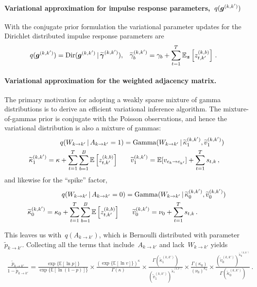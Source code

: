 \paragraph{Variational approximation for impulse response parameters,~$q(\boldsymbol{g}^{(k,k')})$}
With the conjugate prior formulation the variational parameter updates for the Dirichlet distributed impulse response parameters are
\begin{align*}
q(\boldsymbol{g}^{(k,k')}) &= \mathrm{Dir}(\boldsymbol{g}^{(k,k')} \,|\, \widetilde{\boldsymbol{\gamma}}^{(k,k')}), &
\widetilde{\gamma}_b^{(k,k')} &= \gamma_{b} + \sum_{t=1}^T \mathbb{E}_{\boldsymbol{z}}\left[z_{t,k'}^{(k,b)}\right]\,.
\end{align*}

\paragraph{Variational approximation for the weighted adjacency matrix.}
The primary motivation for adopting a weakly sparse mixture of gamma distributions is to derive an efficient variational inference algorithm.
The mixture-of-gammas prior is conjugate with the Poisson observations, and hence the variational distribution is also a mixture of gammas:
\begin{align*}
q(W_{k \to k'} \,|\, A_{k \to k'}=1) &= \mathrm{Gamma}(W_{k \to k'} \,|\, \widetilde{\kappa}^{(k,k')}_1, \widetilde{v}^{(k,k')}_1) \\
\widetilde{\kappa}^{(k,k')}_1 = \kappa + \sum_{t=1}^T \sum_{b=1}^B \mathbb{E}\left[z_{t,k'}^{(k,b)}\right]  \quad & \quad
\widetilde{v}^{(k,k')}_1  = \mathbb{E}[v_{c_k \to c_{k'}}] + \sum_{t=1}^T s_{t,k}\,,
\end{align*}
and likewise for the ``spike'' factor,
\begin{align*}
q(W_{k \to k'} \,|\, A_{k \to k'}=0) &= \mathrm{Gamma}(W_{k \to k'} \,|\, \widetilde{\kappa}^{(k,k')}_0, \widetilde{v}^{(k,k')}_0) \\
\widetilde{\kappa}^{(k,k')}_0 = \kappa_0 + \sum_{t=1}^T \sum_{b=1}^B \mathbb{E}\left[z_{t,k'}^{(k,b)}\right] \quad & \quad
\widetilde{v}^{(k,k')}_0  = \nu_0 + \sum_{t=1}^T s_{t,k}\,.
\end{align*}

This leaves us with~$q(A_{k \to k'})$, which is Bernoulli distributed with parameter~$\widetilde{p}_{k \to k'}$.  
Collecting all the terms that include~$A_{k \to k'}$ and lack~$W_{k \to k'}$ yields
\begin{multline*}
 \frac{\widetilde{p}_{k \to k'}}{1-\widetilde{p}_{k \to k'}} =  
 \frac{\exp\{\mathbb{E} [\ln p] \} }{\exp\{\mathbb{E}[\ln (1-p)] \}} \times 
\frac{ (\exp\{\mathbb{E} [\ln v] \})^{\kappa} }{ \Gamma(\kappa)} \times 
\frac{\Gamma(\widetilde{\kappa}^{(k,k')}_1)}{ (\widetilde{v}^{(k,k')}_1)^{\widetilde{\kappa}^{(k,k')}_1} } \times
\frac{\Gamma(\kappa_0)}{ (\nu_0)^{\kappa_0} } \times
\frac{(\widetilde{v}^{(k,k')}_0)^{\widetilde{\kappa}^{(k,k')}_0}}{ \Gamma(\widetilde{\kappa}^{(k,k')}_0)}\,.
\end{multline*}

